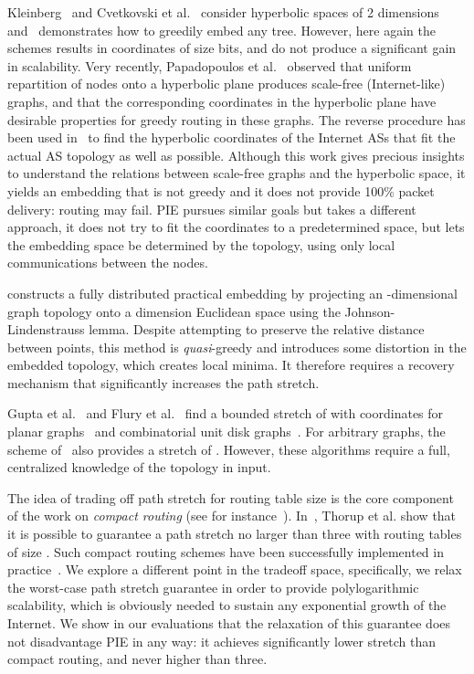 \documentclass[conference]{IEEEtran}
\begin{document}
Kleinberg~\cite{kleinberg:hyperbolic} and Cvetkovski et al.~\cite{Crovella:hyperbolic} consider hyperbolic spaces of 2 dimensions and~\cite{kleinberg:hyperbolic} demonstrates how to greedily embed any tree. However, here again the schemes results in coordinates of size  bits, and do not produce a significant gain in scalability. 
Very recently, Papadopoulos et al.~\cite{papadopoulos10} observed that uniform repartition of nodes onto a hyperbolic plane produces scale-free (Internet-like) graphs, and that the corresponding coordinates in the hyperbolic plane have desirable properties for greedy routing in these graphs. The reverse procedure has been used in~\cite{Krioukov:sustaining} to find the hyperbolic coordinates of the Internet ASs that fit the actual AS topology as well as possible. Although this work gives precious insights to understand the relations between scale-free graphs and the hyperbolic space, 
it yields an embedding that
is not greedy and it does not provide 100\% packet delivery: routing may fail. PIE pursues similar goals but takes a different approach,
it does not try to fit the coordinates to a predetermined space, but lets the embedding space be determined by the topology, using only local communications between the nodes.


\cite{Pei:greedy} constructs a fully distributed practical embedding by projecting an -dimensional graph topology onto a  dimension Euclidean space using the Johnson-Lindenstrauss lemma. Despite attempting to preserve the relative
distance between points, this method is \emph{quasi}-greedy and introduces some distortion in the embedded topology, which creates local minima. It therefore requires a recovery mechanism that significantly increases the path stretch.





Gupta et al.~\cite{gupta} and Flury et al.~\cite{greedy:flury} find a bounded stretch
of  with  coordinates for planar graphs~\cite{gupta} and
combinatorial unit disk graphs~\cite{greedy:flury}. For arbitrary graphs,
the scheme of~\cite{greedy:flury} also provides a stretch of .
However, these algorithms require a full, centralized
knowledge of the topology in input.



The idea of trading off path stretch for routing table size is the core component of the work on {\em compact routing} (see for instance~\cite{krioukov:sigcomm}). In~\cite{thorup:compact},
Thorup et al.
show that it is possible to guarantee a path stretch no larger than three with routing tables of size . Such compact routing schemes have been successfully implemented in practice~\cite{mao:S4,singla2010}. We explore a different point in the tradeoff space, specifically, we relax the worst-case path stretch guarantee in order to provide polylogarithmic scalability, which is obviously needed to sustain any exponential growth of the Internet. We show in our evaluations that the relaxation of this guarantee does not disadvantage PIE in any way: it achieves significantly lower stretch than compact routing, and never higher than three.
\end{document}
